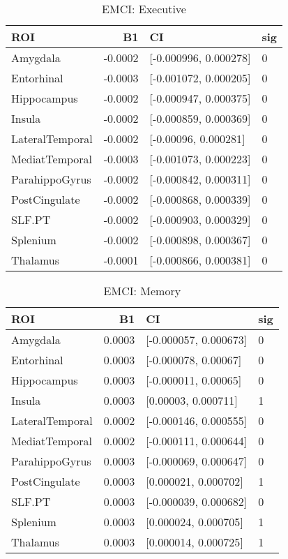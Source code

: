 \documentclass{article}
\begin{document}
\begin{table}[H]
\centering
\caption{EMCI: Executive} 
\begin{tabular}{lrll}
  \toprule
ROI & B1 & CI & sig \\ 
  \midrule
Amygdala & -0.0002 & [-0.000996, 0.000278] & 0 \\ 
  Entorhinal & -0.0003 & [-0.001072, 0.000205] & 0 \\ 
  Hippocampus & -0.0002 & [-0.000947, 0.000375] & 0 \\ 
  Insula & -0.0002 & [-0.000859, 0.000369] & 0 \\ 
  LateralTemporal & -0.0002 & [-0.00096, 0.000281] & 0 \\ 
  MediatTemporal & -0.0003 & [-0.001073, 0.000223] & 0 \\ 
  ParahippoGyrus & -0.0002 & [-0.000842, 0.000311] & 0 \\ 
  PostCingulate & -0.0002 & [-0.000868, 0.000339] & 0 \\ 
  SLF.PT & -0.0002 & [-0.000903, 0.000329] & 0 \\ 
  Splenium & -0.0002 & [-0.000898, 0.000367] & 0 \\ 
  Thalamus & -0.0001 & [-0.000866, 0.000381] & 0 \\ 
   \bottomrule
\end{tabular}
\end{table}%
\begin{table}[H]
\centering
\caption{EMCI: Memory} 
\begin{tabular}{lrll}
  \toprule
ROI & B1 & CI & sig \\ 
  \midrule
Amygdala & 0.0003 & [-0.000057, 0.000673] & 0 \\ 
  Entorhinal & 0.0003 & [-0.000078, 0.00067] & 0 \\ 
  Hippocampus & 0.0003 & [-0.000011, 0.00065] & 0 \\ 
   \rowcolor{orange!30}Insula & 0.0003 & [0.00003, 0.000711] & 1 \\ 
  LateralTemporal & 0.0002 & [-0.000146, 0.000555] & 0 \\ 
  MediatTemporal & 0.0002 & [-0.000111, 0.000644] & 0 \\ 
  ParahippoGyrus & 0.0003 & [-0.000069, 0.000647] & 0 \\ 
   \rowcolor{orange!30}PostCingulate & 0.0003 & [0.000021, 0.000702] & 1 \\ 
  SLF.PT & 0.0003 & [-0.000039, 0.000682] & 0 \\ 
   \rowcolor{orange!30}Splenium & 0.0003 & [0.000024, 0.000705] & 1 \\ 
   \rowcolor{orange!30}Thalamus & 0.0003 & [0.000014, 0.000725] & 1 \\ 
   \bottomrule
\end{tabular}
\end{table}
\end{document}
